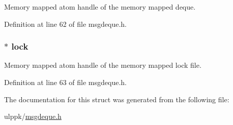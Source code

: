 Memory mapped atom handle of the memory mapped deque. 



Definition at line 62 of file msgdeque.\-h.

\hypertarget{struct___m_s_g_d_e_q_u_e_a45bb7f6a07d34dd2621a5488b5006ffb}{
\subsubsection[{lock}]{$\ast$ lock}}\label{struct___m_s_g_d_e_q_u_e_a45bb7f6a07d34dd2621a5488b5006ffb}


Memory mapped atom handle of the memory mapped lock file. 



Definition at line 63 of file msgdeque.\-h.



The documentation for this struct was generated from the following file\-:\begin{DoxyCompactItemize}
\item 
ulppk/\hyperlink{msgdeque_8h}{msgdeque.\-h}\end{DoxyCompactItemize}
